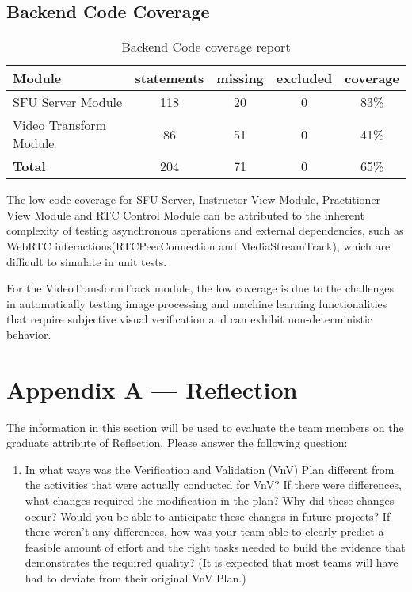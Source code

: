\documentclass[12pt, titlepage]{article}
\begin{document}
\subsection*{Backend Code Coverage}

\begin{table}[htbp]
  \centering
  \begin{tabular}{@{}lcccc@{}}
  \toprule
  \textbf{Module}                   & \textbf{statements} & \textbf{missing} & \textbf{excluded} & \textbf{coverage} \\ \midrule
  SFU Server Module                 & 118                 & 20               & 0                 & 83\%              \\
  Video Transform Module            & 86                  & 51               & 0                 & 41\%              \\ \midrule
  \textbf{Total}                    & 204                 & 71               & 0                 & 65\%              \\ \bottomrule
  \end{tabular}
  \caption{Backend Code coverage report}
  \label{tab:my-table}
\end{table}
The low code coverage for SFU Server, Instructor View Module, Practitioner View Module and RTC Control Module can be attributed to the inherent
complexity of testing asynchronous operations and external dependencies, such as
WebRTC interactions(RTCPeerConnection and MediaStreamTrack), which are difficult
to simulate in unit tests.

For the VideoTransformTrack module, the low coverage is due to the challenges in
automatically testing image processing and machine learning functionalities that
require subjective visual verification and can exhibit non-deterministic
behavior.

\newpage{}
\section*{Appendix A --- Reflection}

The information in this section will be used to evaluate the team members on the
graduate attribute of Reflection.  Please answer the following question:

\begin{enumerate}
  \item In what ways was the Verification and Validation (VnV) Plan different
  from the activities that were actually conducted for VnV?  If there were
  differences, what changes required the modification in the plan?  Why did
  these changes occur?  Would you be able to anticipate these changes in future
  projects?  If there weren't any differences, how was your team able to clearly
  predict a feasible amount of effort and the right tasks needed to build the
  evidence that demonstrates the required quality?  (It is expected that most
  teams will have had to deviate from their original VnV Plan.)
\end{enumerate}
\end{document}
